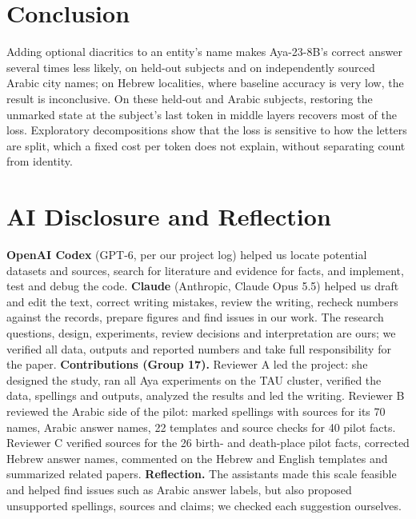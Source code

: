 \documentclass[11pt]{article}
\begin{document}
\section{Conclusion}
Adding optional diacritics to an entity's name makes Aya-23-8B's correct answer
several times less likely, on held-out subjects and on independently sourced
Arabic city names; on Hebrew localities, where
baseline accuracy is very low, the result is inconclusive. On these held-out and
Arabic subjects, restoring the unmarked state at the subject's last token in
middle layers recovers most of the loss. Exploratory decompositions show that the loss is sensitive to how the letters are split, which a fixed cost per token does not explain, without separating count from identity.

\section*{AI Disclosure and Reflection}
\textbf{OpenAI Codex} (GPT-6, per our project
log) helped us locate potential datasets and sources, search for literature and
evidence for facts, and implement, test and debug the code. \textbf{Claude} (Anthropic, Claude
Opus 5.5) helped us draft and edit the text, correct writing mistakes, review the
writing, recheck numbers against the records, prepare figures and find issues in
our work. The
research questions, design, experiments, review decisions and interpretation are
ours; we verified all data, outputs and reported numbers and take full
responsibility for the paper.
\textbf{Contributions (Group 17).} Reviewer A led the project: she designed the
study, ran all Aya experiments on the TAU cluster, verified the data, spellings
and outputs, analyzed the results and led the writing. Reviewer B reviewed the
Arabic side of the pilot: marked spellings with sources for its 70 names, Arabic
answer names, 22 templates and source checks for 40 pilot facts. Reviewer C
verified sources for the 26 birth- and death-place pilot facts, corrected
Hebrew answer names, commented on the Hebrew and English templates and summarized
related papers.
\textbf{Reflection.} The assistants made this scale feasible and helped find
issues such as Arabic answer labels, but also proposed unsupported spellings, sources
and claims; we checked each suggestion ourselves.



\appendix
\end{document}
